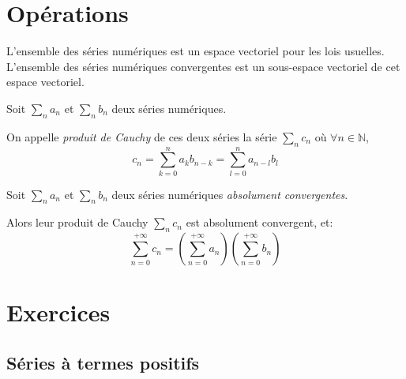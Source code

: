 \documentclass{yann}
\begin{document}
\section{Opérations}


L'ensemble des séries numériques est un espace vectoriel pour les lois usuelles.
L'ensemble des séries numériques convergentes est un sous-espace vectoriel de cet espace vectoriel.


Soit $∑_n a_n$ et $∑_n b_n$ deux séries numériques.

On appelle \emph{produit de Cauchy} de ces deux séries la série
$∑_n c_n$ où $∀n∈ℕ$,
\[ c_n =∑_{k=0}^n a_k b_{n-k} =∑_{l=0}^n a_{n-l} b_l \]


Soit $∑_n a_n$ et $∑_n b_n$ deux séries numériques \emph{absolument convergentes}.

Alors leur produit de Cauchy $∑_n c_n$ est absolument convergent, et:
\[ ∑_{n=0}^{+∞} c_n = \left(∑_{n=0}^{+∞} a_n \right) \left(∑_{n=0}^{+∞} b_n \right) \]

\section{Exercices}

\subsection{Séries à termes positifs}

\Exercice
\end{document}
